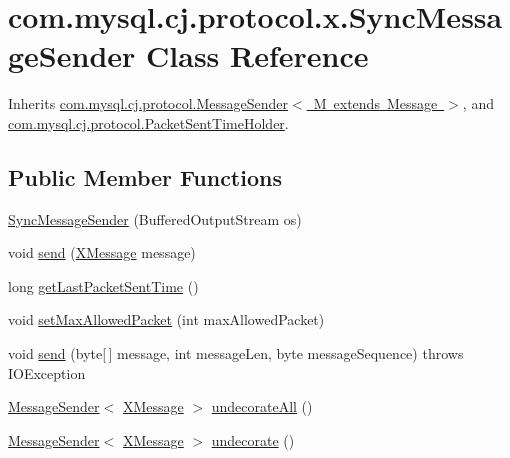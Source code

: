 \hypertarget{classcom_1_1mysql_1_1cj_1_1protocol_1_1x_1_1_sync_message_sender}{}\section{com.\+mysql.\+cj.\+protocol.\+x.\+Sync\+Message\+Sender Class Reference}
\label{classcom_1_1mysql_1_1cj_1_1protocol_1_1x_1_1_sync_message_sender}


Inherits \mbox{\hyperlink{interfacecom_1_1mysql_1_1cj_1_1protocol_1_1_message_sender}{com.\+mysql.\+cj.\+protocol.\+Message\+Sender$<$ M extends Message $>$}}, and \mbox{\hyperlink{interfacecom_1_1mysql_1_1cj_1_1protocol_1_1_packet_sent_time_holder}{com.\+mysql.\+cj.\+protocol.\+Packet\+Sent\+Time\+Holder}}.

\subsection*{Public Member Functions}
\begin{DoxyCompactItemize}
\item 
\mbox{\hyperlink{classcom_1_1mysql_1_1cj_1_1protocol_1_1x_1_1_sync_message_sender_a166b97eef951d91fcd64f0db3db5fbce}{Sync\+Message\+Sender}} (Buffered\+Output\+Stream os)
\item 
void \mbox{\hyperlink{classcom_1_1mysql_1_1cj_1_1protocol_1_1x_1_1_sync_message_sender_af1f0d9d9427519379b24b2fb991d4ea7}{send}} (\mbox{\hyperlink{classcom_1_1mysql_1_1cj_1_1protocol_1_1x_1_1_x_message}{X\+Message}} message)
\item 
long \mbox{\hyperlink{classcom_1_1mysql_1_1cj_1_1protocol_1_1x_1_1_sync_message_sender_a43022535ec5a2b7c1ac10cf339009439}{get\+Last\+Packet\+Sent\+Time}} ()
\item 
void \mbox{\hyperlink{classcom_1_1mysql_1_1cj_1_1protocol_1_1x_1_1_sync_message_sender_aa403c14cdcc078b9250830c85f6dbbf9}{set\+Max\+Allowed\+Packet}} (int max\+Allowed\+Packet)
\item 
void \mbox{\hyperlink{classcom_1_1mysql_1_1cj_1_1protocol_1_1x_1_1_sync_message_sender_a3fdd323d523578fb3c30b25eda718c0c}{send}} (byte\mbox{[}$\,$\mbox{]} message, int message\+Len, byte message\+Sequence)  throws I\+O\+Exception 
\item 
\mbox{\hyperlink{interfacecom_1_1mysql_1_1cj_1_1protocol_1_1_message_sender}{Message\+Sender}}$<$ \mbox{\hyperlink{classcom_1_1mysql_1_1cj_1_1protocol_1_1x_1_1_x_message}{X\+Message}} $>$ \mbox{\hyperlink{classcom_1_1mysql_1_1cj_1_1protocol_1_1x_1_1_sync_message_sender_a7228daf021acf6d8505108645317825d}{undecorate\+All}} ()
\item 
\mbox{\hyperlink{interfacecom_1_1mysql_1_1cj_1_1protocol_1_1_message_sender}{Message\+Sender}}$<$ \mbox{\hyperlink{classcom_1_1mysql_1_1cj_1_1protocol_1_1x_1_1_x_message}{X\+Message}} $>$ \mbox{\hyperlink{classcom_1_1mysql_1_1cj_1_1protocol_1_1x_1_1_sync_message_sender_aa8fd388e5d4e5e86cb35add7f6e45c7b}{undecorate}} ()
\end{DoxyCompactItemize}


